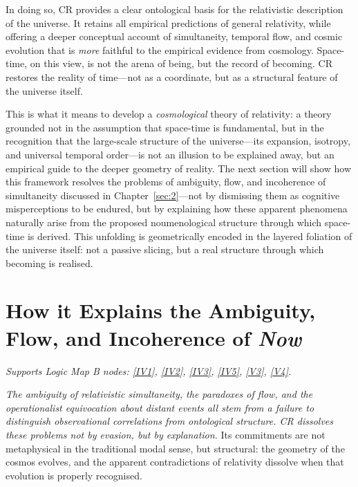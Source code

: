 \documentclass[12pt]{book}
\begin{document}
In doing so, CR provides a clear ontological basis for the relativistic description of the universe. It retains all empirical predictions of general relativity, while offering a deeper conceptual account of simultaneity, temporal flow, and cosmic evolution that is \textit{more} faithful to the empirical evidence from cosmology. Space-time, on this view, is not the arena of being, but the record of becoming. CR restores the reality of time---not as a coordinate, but as a structural feature of the universe itself.

This is what it means to develop a \textit{cosmological} theory of relativity: a theory grounded not in the assumption that space-time is fundamental, but in the recognition that the large-scale structure of the universe---its expansion, isotropy, and universal temporal order---is not an illusion to be explained away, but an empirical guide to the deeper geometry of reality. The next section will show how this framework resolves the problems of ambiguity, flow, and incoherence of simultaneity discussed in Chapter~\ref{sec:2}---not by dismissing them as cognitive misperceptions to be endured, but by explaining how these apparent phenomena naturally arise from the proposed noumenological structure through which space-time is derived. This unfolding is geometrically encoded in the layered foliation of the universe itself: not a passive slicing, but a real structure through which becoming is realised.

\section[How it Explains Relativistic Ambiguity, Flow, and Incoherence]{How it Explains the Ambiguity, Flow, and Incoherence of \textit{Now}}\label{sec:5.2}
\noindent\textit{Supports Logic Map B nodes: \hyperref[appendix:IV1]{[IV1]}, \hyperref[appendix:IV2]{[IV2]}, \hyperref[appendix:IV3]{[IV3]}, \hyperref[appendix:IV5]{[IV5]}, \hyperref[appendix:V3]{[V3]}, \hyperref[appendix:V4]{[V4]}.}

\vspace{4pt}

\textit{The ambiguity of relativistic simultaneity, the paradoxes of flow, and the operationalist equivocation about distant events all stem from a failure to distinguish observational correlations from ontological structure. CR dissolves these problems not by evasion, but by explanation.} Its commitments are not metaphysical in the traditional modal sense, but structural: the geometry of the cosmos evolves, and the apparent contradictions of relativity dissolve when that evolution is properly recognised.
\end{document}
